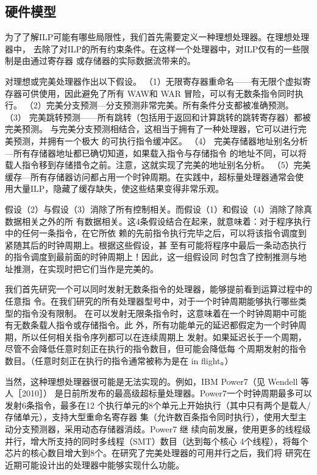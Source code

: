 \subsection{硬件模型}

为了了解ILP可能有哪些局限性，我们首先需要定义一种理想处理器。在理想处理器中，
去除了对ILP的所有约束条件。在这样一个处理器中，对ILP仅有的一些限制是由通过寄存器
或存储器的实际数据流带来的。

对理想或完美处理器作出以下假设。
（1）无限寄存器重命名——有无限个虚拟寄存器可供使用，因此避免了所有 WAW和 WAR
冒险，可以有无数条指令同时执行。
（2）完美分支预测—分支预测非常完美。所有条件分支都被准确预测。
（3） 完美跳转预测——所有跳转（包括用于返回和计算跳转的跳转寄存器）都被完美预测。
与完美分支预测相结合，这相当于拥有了一种处理器，它可以进行完美预测，并拥有一个极大
的可执行指令缓冲区。
（4） 完美存储器地址别名分析—所有存储器地址都已确切知道，如果载入指令与存储指令
的地址不同，可以将载人指令移到存储措令之前。注意，这就实现了完美的地址别名分析。
（5）完美缓存—所有存储器访问都占用一个时钟周期。在实践中，超标量处理器通常会使
用大量ILP，隐藏了缓存缺失，使这些结果变得非常乐观。

假设（2）与假设（3）消除了所有控制相关。而假设（1）和假设（4）消除了除真数据相关之外的所
有数据相关。这4条假设结合在起来，就意味着：对于程序执行中的任何一条指令，在它所依
赖的先前指令执行完毕之后，可以将该指令调度到紧随其后的时钟周期上。根据这些假设，甚
至有可能将程序中最后一条动态执行的指令调度到最前面的时钟周期上！因此，这一组假设同
时包含了控制推测与地址推测，在实现时把它们当作是完美的。

我们首先研究一个可以同时发射无数条指令的处理器，能够提前看到运算过程中的任意指
令。在我们研究的所有处理器型号中，对于一个时钟周期能够执行哪些类型的指令没有限制。
在可以发射无限条指令时，这意味着在一个时钟周期中可能有无数条载人指令或存储指令。此
外，所有功能单元的延迟都假定为一个时钟周期，所以任何相关指令序列都可以在连续周期上
发射。如果延迟长于一个周期，尽管不会降低任意时刻正在执行的指令数目，但可能会降低每
个周期发射的指令数目。（任意时刻正在执行的指令通常被称为是在 in flight。）

当然，这种理想处理器很可能是无法实现的。例如，IBM Power7（见 Wendell 等人［2010］）
是日前所发布的最高级超标量处理器。Power7一个时钟周期最多可以发射6条指令，最多在12
个执行单元的8个单元上开始执行（其中只有两个是载人/存储单元），支持大型重命名寄存器
集（允许数百条指令同时执行），使用大型主动分支预测器，采用动态存储器消歧。Power7 继
续向前发展，使用更多的线程级并行，增大所支持的同时多线程（SMT）数目（达到每个核心
4个线程），将每个芯片的核心数目增大到8个。在研究了完美处理器的可用并行之后，我们将
研究在近期可能设计出的处理器中能够实现什么功能。

